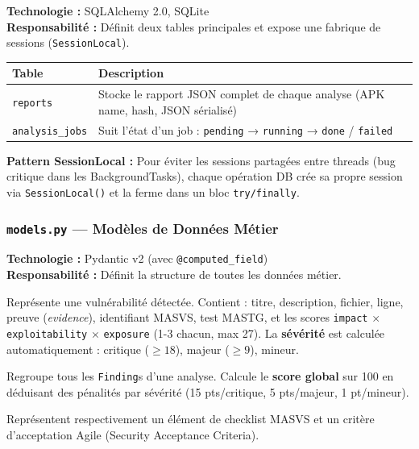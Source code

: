 \documentclass[12pt,a4paper,french]{article}
\newcommand{\file}[1]{\textcolor{primary}{\texttt{#1}}}
\begin{document}
\begin{tcolorbox}[toolbox, title={Rôle : ORM SQLite + Modèles de Base de Données}]
\textbf{Technologie :} SQLAlchemy 2.0, SQLite\\
\textbf{Responsabilité :} Définit deux tables principales et expose une fabrique
de sessions (\texttt{SessionLocal}).
\end{tcolorbox}

\begin{center}
\renewcommand{\arraystretch}{1.3}
\begin{tabular}{lp{9cm}}
\toprule
\textbf{Table} & \textbf{Description} \\
\midrule
\rowcolor{primary!5}
\texttt{reports} & Stocke le rapport JSON complet de chaque analyse (APK name, hash, JSON sérialisé) \\
\texttt{analysis\_jobs} & Suit l'état d'un job : \texttt{pending} → \texttt{running} → \texttt{done} / \texttt{failed} \\
\bottomrule
\end{tabular}
\end{center}

\textbf{Pattern SessionLocal :} Pour éviter les sessions partagées entre threads (bug critique
dans les BackgroundTasks), chaque opération DB crée sa propre session via \texttt{SessionLocal()}
et la ferme dans un bloc \texttt{try/finally}.

\subsubsection{\file{models.py} — Modèles de Données Métier}

\begin{tcolorbox}[toolbox, title={Rôle : Contrats de Données Pydantic}]
\textbf{Technologie :} Pydantic v2 (avec \texttt{@computed\_field})\\
\textbf{Responsabilité :} Définit la structure de toutes les données métier.
\end{tcolorbox}

\begin{description}[leftmargin=2cm, style=nextline]
  \item[\texttt{Finding}]
    Représente une vulnérabilité détectée. Contient : titre, description, fichier, ligne,
    preuve (\textit{evidence}), identifiant MASVS, test MASTG, et les scores
    \texttt{impact} × \texttt{exploitability} × \texttt{exposure} (1-3 chacun, max 27).
    La \textbf{sévérité} est calculée automatiquement : critique ($\geq 18$), majeur ($\geq 9$), mineur.

  \item[\texttt{AuditReport}]
    Regroupe tous les \texttt{Finding}s d'une analyse. Calcule le \textbf{score global}
    sur 100 en déduisant des pénalités par sévérité (15 pts/critique, 5 pts/majeur, 1 pt/mineur).

  \item[\texttt{ChecklistItem} / \texttt{SACItem}]
    Représentent respectivement un élément de checklist MASVS et un critère d'acceptation Agile
    (Security Acceptance Criteria).
\end{description}
\end{document}
